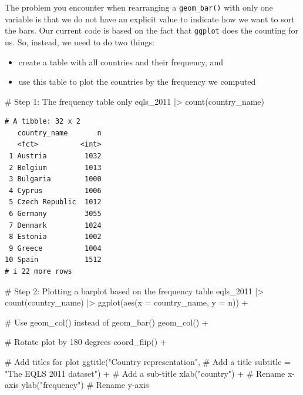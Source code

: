 \documentclass[
  letterpaper,
  DIV=11,
  numbers=noendperiod]{scrreprt}
\newenvironment{Shaded}{\begin{snugshade}}{\end{snugshade}}
\newcommand{\AttributeTok}[1]{\textcolor[rgb]{0.40,0.45,0.13}{#1}}
\newcommand{\CommentTok}[1]{\textcolor[rgb]{0.37,0.37,0.37}{#1}}
\newcommand{\FunctionTok}[1]{\textcolor[rgb]{0.28,0.35,0.67}{#1}}
\newcommand{\NormalTok}[1]{\textcolor[rgb]{0.00,0.23,0.31}{#1}}
\newcommand{\SpecialCharTok}[1]{\textcolor[rgb]{0.37,0.37,0.37}{#1}}
\newcommand{\StringTok}[1]{\textcolor[rgb]{0.13,0.47,0.30}{#1}}
\begin{document}
The problem you encounter when rearranging a \texttt{geom\_bar()} with
only one variable is that we do not have an explicit value to indicate
how we want to sort the bars. Our current code is based on the fact that
\texttt{ggplot} does the counting for us. So, instead, we need to do two
things:

\begin{itemize}
\item
  create a table with all countries and their frequency, and
\item
  use this table to plot the countries by the frequency we computed
\end{itemize}

\begin{Shaded}
\begin{Highlighting}[]
\CommentTok{\# Step 1: The frequency table only}
\NormalTok{eqls\_2011 }\SpecialCharTok{|\textgreater{}} \FunctionTok{count}\NormalTok{(country\_name)}
\end{Highlighting}
\end{Shaded}

\begin{verbatim}
# A tibble: 32 x 2
   country_name       n
   <fct>          <int>
 1 Austria         1032
 2 Belgium         1013
 3 Bulgaria        1000
 4 Cyprus          1006
 5 Czech Republic  1012
 6 Germany         3055
 7 Denmark         1024
 8 Estonia         1002
 9 Greece          1004
10 Spain           1512
# i 22 more rows
\end{verbatim}

\begin{Shaded}
\begin{Highlighting}[]
\CommentTok{\# Step 2: Plotting a barplot based on the frequency table}
\NormalTok{eqls\_2011 }\SpecialCharTok{|\textgreater{}}
  \FunctionTok{count}\NormalTok{(country\_name) }\SpecialCharTok{|\textgreater{}}
  \FunctionTok{ggplot}\NormalTok{(}\FunctionTok{aes}\NormalTok{(}\AttributeTok{x =}\NormalTok{ country\_name, }\AttributeTok{y =}\NormalTok{ n)) }\SpecialCharTok{+}

  \CommentTok{\# Use geom\_col() instead of geom\_bar()}
  \FunctionTok{geom\_col}\NormalTok{() }\SpecialCharTok{+}
  
  \CommentTok{\# Rotate plot by 180 degrees}
  \FunctionTok{coord\_flip}\NormalTok{() }\SpecialCharTok{+}

  \CommentTok{\# Add titles for plot}
  \FunctionTok{ggtitle}\NormalTok{(}\StringTok{"Country representation"}\NormalTok{,              }\CommentTok{\# Add a title}
          \AttributeTok{subtitle =} \StringTok{"The EQLS 2011 dataset"}\NormalTok{) }\SpecialCharTok{+}  \CommentTok{\# Add a sub{-}title}
  \FunctionTok{xlab}\NormalTok{(}\StringTok{"country"}\NormalTok{) }\SpecialCharTok{+}                              \CommentTok{\# Rename x{-}axis}
  \FunctionTok{ylab}\NormalTok{(}\StringTok{"frequency"}\NormalTok{)                              }\CommentTok{\# Rename y{-}axis  }
\end{Highlighting}
\end{Shaded}
\end{document}
